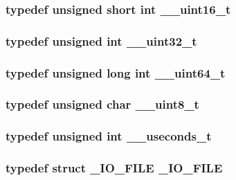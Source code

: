 \subsubsection[{\_\-\_\-uint16\_\-t}]{\setlength{\rightskip}{0pt plus 5cm}typedef unsigned short int {\bf \_\-\_\-uint16\_\-t}}\label{tp_8c_ae191cf54b09af0e7f674cb7c599167e9}
\subsubsection[{\_\-\_\-uint32\_\-t}]{\setlength{\rightskip}{0pt plus 5cm}typedef unsigned int {\bf \_\-\_\-uint32\_\-t}}\label{tp_8c_acaa96aed3d7fddac490800f166c2af02}
\subsubsection[{\_\-\_\-uint64\_\-t}]{\setlength{\rightskip}{0pt plus 5cm}typedef unsigned long int {\bf \_\-\_\-uint64\_\-t}}\label{tp_8c_ada0d1deb69253bd55d01fa22cce9f19d}
\subsubsection[{\_\-\_\-uint8\_\-t}]{\setlength{\rightskip}{0pt plus 5cm}typedef unsigned char {\bf \_\-\_\-uint8\_\-t}}\label{tp_8c_a25875528640a3eee1a026956baa82249}
\subsubsection[{\_\-\_\-useconds\_\-t}]{\setlength{\rightskip}{0pt plus 5cm}typedef unsigned int {\bf \_\-\_\-useconds\_\-t}}\label{tp_8c_a1174240000a042e714b4c01aff232d9a}
\subsubsection[{\_\-IO\_\-FILE}]{\setlength{\rightskip}{0pt plus 5cm}typedef struct {\bf \_\-IO\_\-FILE} {\bf \_\-IO\_\-FILE}}\label{tp_8c_a71085569b5654df8946f8423b93906ac}
